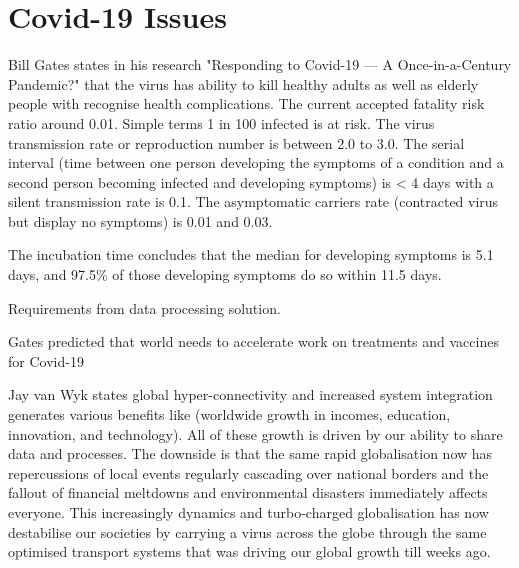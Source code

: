 \section{Covid-19 Issues}

Bill Gates states in his research "Responding to Covid-19 — A Once-in-a-Century Pandemic?" that the virus has ability to kill healthy adults as well as elderly people with recognise health complications. The current accepted fatality risk ratio around 0.01. Simple terms 1 in 100 infected is at risk. The virus transmission rate or reproduction number \cite{medicalnews001} is between 2.0 to 3.0. The serial interval (time between one person developing the symptoms of a condition and a second person becoming infected and developing symptoms) is < 4 days with a silent transmission rate \cite{medicalnews001} is 0.1. 
The asymptomatic carriers rate (contracted virus but display no symptoms) \cite{medicalnews001} is 0.01 and 0.03.

The incubation time concludes that the median for developing symptoms is 5.1 days, and 97.5\% of those developing symptoms do so within 11.5 days.



Requirements from data processing solution.


Gates \cite{Gates2018} predicted that world needs to accelerate work on treatments and vaccines for Covid-19 

Jay van Wyk \cite{Wyk2015} states global hyper-connectivity and increased system integration generates various benefits like (worldwide growth in incomes, education, innovation, and technology). All of these growth is driven by our ability to share data and processes. The downside is that the same rapid globalisation now has repercussions of local events regularly cascading over national borders and the fallout of financial meltdowns and environmental disasters immediately affects everyone. This increasingly dynamics and turbo-charged globalisation has now destabilise our societies by carrying a virus across the globe through the same optimised transport systems that was driving our global growth till weeks ago.


